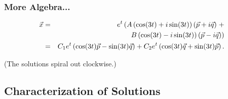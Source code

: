 \begin{frame}
  \frametitle{More Algebra...}

  \begin{eqnarray*}
    \vec{x} & = & e^{t} \left(
      A\left( \cos(3t) + i \sin(3t) \right) \left( \vec{p} + i \vec{q} \right)  \right. + \\
    & & \left.
  ~~~~ B \left( \cos(3t) - i \sin(3t) \right) \left( \vec{p} - i \vec{q} \right) \right) \\
  & = & C_1 e^{t} \left( \cos(3t) \vec{p} - \sin(3t) \vec{q} \right)
  + C_2 e^{t} \left( \cos(3t) \vec{q} + \sin(3t) \vec{p} \right).
  \end{eqnarray*}

  (The solutions spiral out clockwise.)


\end{frame}



\subsection{Characterization of Solutions}

